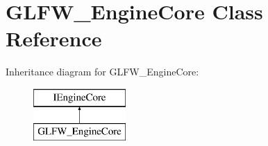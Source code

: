 \hypertarget{class_g_l_f_w___engine_core}{}\section{G\+L\+F\+W\+\_\+\+Engine\+Core Class Reference}
\label{class_g_l_f_w___engine_core}
Inheritance diagram for G\+L\+F\+W\+\_\+\+Engine\+Core\+:\begin{figure}[H]
\begin{center}
\leavevmode
\includegraphics[height=2.000000cm]{class_g_l_f_w___engine_core}
\end{center}
\end{figure}
